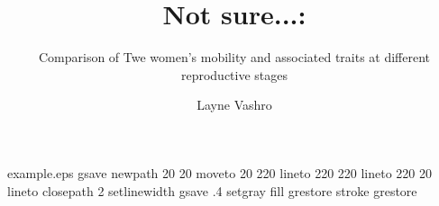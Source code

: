 %
%
%
%
%
\begin{filecontents*}{example.eps}
gsave
newpath
  20 20 moveto
  20 220 lineto
  220 220 lineto
  220 20 lineto
closepath
2 setlinewidth
gsave
  .4 setgray fill
grestore
stroke
grestore
\end{filecontents*}
%
\RequirePackage{fix-cm}
%
\documentclass[smallextended]{svjour3}       %
%
\smartqed  %
%
\usepackage{graphicx}
%
%
%
%
%


\title{Not sure...:%
}
\subtitle{Comparison of Twe women's mobility and associated traits at different reproductive stages}


\author{Layne Vashro
}



